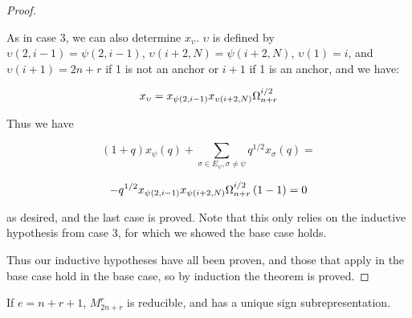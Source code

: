 \documentclass{amsart}
\begin{document}
\begin{proof}
\begin{enumerate}[label={case \arabic*:}]
 		As in case 3, we can also determine $x_\upsilon$. $\upsilon$ is defined by $\upsilon(2,i-1)=\psi(2,i-1)$, $\upsilon(i+2,N)=\psi(i+2,N)$, $\upsilon(1)=i$, and $\upsilon(i+1)=2n+r$ if 1 is not an anchor or $i+1$ if 1 is an anchor, and we have:
 		
 		$$x_\upsilon=x_{\psi(2,i-1)}x_{\upsilon(i+2,N)}\Omega_{n+r}^{i/2}$$
 		
 		Thus we have
 		
 		$$(1+q)x_\psi(q)+\sum_{\sigma\in E_\psi,\sigma\not=\psi}q^{1/2}x_\sigma(q)=$$
 		
 		$$-q^{1/2}x_{\psi(2,i-1)}x_{\psi(i+2,N)}\Omega_{n+r}^{i/2}\left( 1-1 \right)=0$$
 		
 		as desired, and the last case is proved. Note that this only relies on the inductive hypothesis from case 3, for which we showed the base case holds.
 	\end{enumerate}
 	
 	Thus our inductive hypotheses have all been proven, and those that apply in the base case hold in the base case, so by induction the theorem is proved.
 	
 \end{proof}
 
 \begin{corollary}
 	If $e=n+r+1$, $M_{2n+r}^r$ is reducible, and has a unique sign subrepresentation.
 \end{corollary}
 
\end{document}
